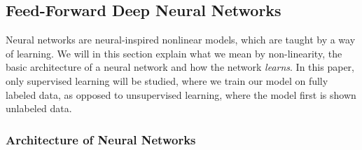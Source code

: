 \documentclass[12pt]{extarticle}
\begin{document}
\subsection{Feed-Forward Deep Neural Networks}\label{sec:NeuralNetwork}
Neural networks are neural-inspired nonlinear models, which are taught by a way of learning. We will in this section explain what we mean by non-linearity, the basic architecture of a neural network and how the network \emph{learns}. In this paper, only supervised learning will be studied, where we train our model on fully labeled data, as opposed to unsupervised learning, where the model first is shown unlabeled data.

\subsubsection{Architecture of Neural Networks}
\end{document}
